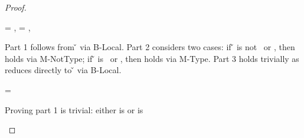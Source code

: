 \begin{lemma}
\begin{enumerate}
\begin{proof}
\begin{case}[T-Nil]
\end{case}

\begin{case}[T-Local]
\e{} = \x{}, \object{} = \x{}, \inpropenv{\propenv{}}{\isprop{\t{}}{\x{}}}

Part 1 follows from \inopenv{\openv{}}{\x{}} {\v{}} via B-Local.
Part 2 considers two cases: if \v{} is not \false\ or \nil, then 
\satisfies{\openv{}}{\notprop{\falsy}{\x{}}} holds via M-NotType; if \v{} is \false\ or \nil, then 
\satisfies{\openv{}}{\isprop{\falsy}{\x{}}} holds via M-Type.
Part 3 holds trivially as \x{} reduces directly to \v{} via B-Local.

\end{case}

\begin{case}[T-Do]
\e{} = { {}}

Proving part 1 is trivial: either \object{} is \emptyobject or 
is 

\end{case}

\end{proof}

\end{enumerate}
\end{lemma}
